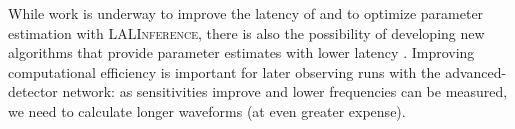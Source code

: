 While work is underway to improve the latency of and to optimize parameter estimation with \textsc{LALInference}, there is also the possibility of developing new algorithms that provide parameter estimates with lower latency \citep{ankow:2015cra}. Improving computational efficiency is important for later observing runs with the advanced-detector network: as sensitivities improve and lower frequencies can be measured, we need to calculate longer waveforms (at even greater expense).
  
  